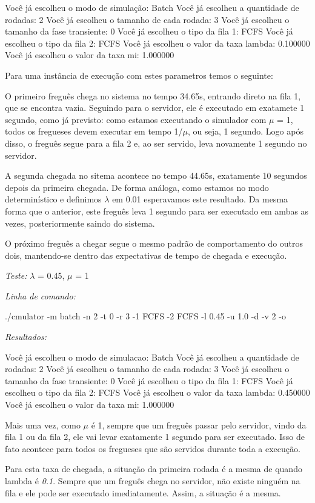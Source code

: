 \documentclass[a4paper,10pt]{article}
\begin{document}
Você já escolheu o modo de simulação: Batch
Você já escolheu a quantidade de rodadas: 2
Você já escolheu o tamanho de cada rodada: 3
Você já escolheu o tamanho da fase transiente: 0
Você já escolheu o tipo da fila 1: FCFS
Você já escolheu o tipo da fila 2: FCFS
Você já escolheu o valor da taxa lambda: 0.100000
Você já escolheu o valor da taxa mi: 1.000000

Para uma instância de execução com estes parametros temos o seguinte:

O primeiro freguês chega no sistema no tempo 34.65s, entrando direto na fila 1, que se encontra vazia. Seguindo para o servidor, ele é executado em exatamete 1 segundo, como já previsto: como estamos executando o simulador com $\mu$ = 1, todos os fregueses devem executar em tempo 1/$\mu$, ou seja, 1 segundo. Logo após disso, o freguês segue para a fila 2 e, ao ser servido, leva novamente 1 segundo no servidor. 

A segunda chegada no sitema acontece no tempo 44.65s, exatamente 10 segundos depois da primeira chegada. De forma análoga, como estamos no modo determinístico e definimos $\lambda$ em 0.01 esperavamos este resultado. Da mesma forma que o anterior, este freguês leva 1 segundo para ser executado em ambas as vezes, posteriormente saindo do sistema.

O próximo freguês a chegar segue o mesmo padrão de comportamento do outros dois, mantendo-se dentro das expectativas de tempo de chegada e execução.

\emph{Teste:} $\lambda$ = 0.45, $\mu$ = 1

\emph{Linha de comando:}

./cmulator -m batch -n 2 -t 0 -r 3 -1 FCFS -2 FCFS -l 0.45 -u 1.0 -d -v 2 -o

\emph{Resultados:}

Você já escolheu o modo de simulacao: Batch
Você já escolheu a quantidade de rodadas: 2
Você já escolheu o tamanho de cada rodada: 3
Você já escolheu o tamanho da fase transiente: 0
Você já escolheu o tipo da fila 1: FCFS
Você já escolheu o tipo da fila 2: FCFS
Você já escolheu o valor da taxa lambda: 0.450000
Você já escolheu o valor da taxa mi: 1.000000

    Mais uma vez, como $\mu$ é 1, sempre que um freguês passar pelo servidor, vindo da fila 1 ou da fila 2, ele vai levar exatamente 1 segundo para ser executado. Isso de fato acontece para todos os fregueses que são servidos durante toda a execução.

    Para esta taxa de chegada, a situação da primeira rodada é a mesma de quando lambda é \emph{0.1}. Sempre que um freguês chega no servidor, não existe ninguém na fila e ele pode ser executado imediatamente. Assim, a situação é a mesma.
\end{document}
